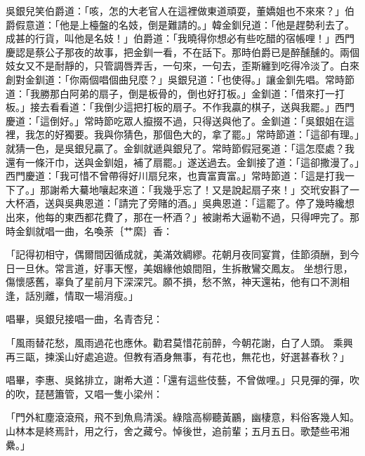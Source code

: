 \begin{showcontents}{}
吳銀兒笑伯爵道：「咳，怎的大老官人在這裡做東道頑耍，董嬌姐也不來來？」伯爵假意道：「他是上檯盤的名妓，倒是難請的。」韓金釧兒道：「他是趕勢利去了。成甚的行貨，叫他是名妓！」伯爵道：「我曉得你想必有些吃醋的宿帳哩！」西門慶認是蔡公子那夜的故事，把金釧一看，不在話下。那時伯爵已是醉醺醺的。兩個妓女又不是耐靜的，只管調唇弄舌，一句來，一句去，歪斯纏到吃得冷淡了。白來創對金釧道：「你兩個唱個曲兒麼？」吳銀兒道：「也使得。」讓金釧先唱。常時節道：「我勝那白阿弟的扇子，倒是板骨的，倒也好打板。」金釧道：「借來打一打板。」接去看看道：「我倒少這把打板的扇子。不作我贏的棋子，送與我罷。」西門慶道：「這倒好。」常時節吃眾人攛掇不過，只得送與他了。金釧道：「吳銀姐在這裡，我怎的好獨要。我與你猜色，那個色大的，拿了罷。」常時節道：「這卻有理。」就猜一色，是吳銀兒贏了。金釧就遞與銀兒了。常時節假冠冕道：「這怎麼處？我還有一條汗巾，送與金釧姐，補了扇罷。」遂送過去。金釧接了道：「這卻撒漫了。」西門慶道：「我可惜不曾帶得好川扇兒來，也賣富賣富。」常時節道：「這是打我一下了。」那謝希大驀地嚷起來道：「我幾乎忘了！又是說起扇子來！」交玳安斟了一大杯酒，送與吳典恩道：「請完了旁賭的酒。」吳典恩道：「這罷了。停了幾時纔想出來，他每的東西都花費了，那在一杯酒？」被謝希大逼勒不過，只得呷完了。那時金釧就唱一曲，名喚荼｛艹縻｝香：

「記得初相守，偶爾間因循成就，美滿效綢繆。花朝月夜同宴賞，佳節須酬，到今日一旦休。常言道，好事天慳，美姻緣他娘間阻，生拆散鸞交鳳友。  坐想行思，傷懷感舊，辜負了星前月下深深咒。願不損，愁不煞，神天還祐，他有口不測相逢，話別離，情取一場消瘦。」

唱畢，吳銀兒接唱一曲，名青杏兒：

「風雨替花愁，風雨過花也應休。勸君莫惜花前醉，今朝花謝，白了人頭。  乘興再三甌，揀溪山好處追遊。但教有酒身無事，有花也，無花也，好選甚春秋？」

唱畢，李惠、吳銘排立，謝希大道：「還有這些伎藝，不曾做哩。」只見彈的彈，吹的吹，琵琶簫管，又唱一隻小梁州：

「門外紅塵滾滾飛，飛不到魚鳥清溪。綠陰高柳聽黃鸝，幽棲意，料俗客幾人知。山林本是終焉計，用之行，舍之藏兮。悼後世，追前輩；五月五日。歌楚些弔湘纍。」


\end{showcontents}
